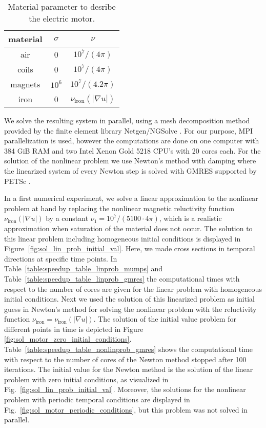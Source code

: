 \documentclass[12pt]{article}
\numberwithin{equation}{section}
\begin{document}
\begin{table}
  \caption{Material parameter to desribe the electric motor.}
  \label{table:material_paramter}
\begin{center}
\begin{tabular}[tbhp]{ |ccc| } 
 \hline
 material & $\sigma$ & $\nu$ \\
 \hline
 air & 0 & $10^7 / (4 \pi) $  \\ 
 coils & 0 & $10^7 / (4 \pi)$ \\
 magnets & $10^6$ & $10^7 / (4.2 \pi)$ \\ 
 iron & 0 & $\nu_{\text{iron}}(|\nabla u|)$ \\  
 \hline
\end{tabular}
\end{center}
\end{table}

We solve the resulting system in parallel, using a mesh decomposition
method provided by the finite element library Netgen/NGSolve \cite{netgen}.
For our purpose, MPI parallelization is used, however the computations are
done on one computer with 384 GiB RAM and two Intel Xenon Gold 5218 CPU’s with 20 cores each.
For the solution of the nonlinear problem we use Newton's method with damping where the linearized system of every Newton step is solved with
GMRES supported by PETSc \cite{DaPaKlCo2011}.

In a first numerical experiment, we solve a linear approximation to the nonlinear problem at hand by replacing the nonlinear magnetic reluctivity function $\nu_{\text{iron}}(|\nabla u|)$ by a constant $\nu_1 = 10^7/(5100 \cdot 4 \pi)$, which is a realistic approximation when saturation of the material does not occur. The solution to this linear problem including homogeneous initial conditions is displayed in Figure~\ref{fig:sol_lin_prob_initial_val}. Here, we made cross sections in
temporal directions at specific time points. In Table~\ref{table:speedup_table_linprob_mumps} and
Table~\ref{table:speedup_table_linprob_gmres} the computational times with
respect to the number of cores are given for the linear problem with
homogeneous initial conditions. Next we used the solution of this linearized problem as initial guess in Newton's method for solving the nonlinear problem with the reluctivity function $\nu_{\text{iron}}=\nu_{\text{iron}}(|\nabla u|)$. The solution of the initial value problem for different points in time is depicted in Figure \ref{fig:sol_motor_zero_initial_conditions}.
Table~\ref{table:speedup_table_nonlinprob_gmres}
shows the computational time with respect to the number of cores of the
Newton method stopped after 100 iterations. The initial value for the
Newton method is the solution of the linear problem with zero initial
conditions, as visualized in Fig.~\ref{fig:sol_lin_prob_initial_val}.
Moreover, the solutions for the nonlinear problem with periodic temporal conditions
are displayed in Fig.~\ref{fig:sol_motor_periodic_conditions}, but this problem
was not solved in parallel.
\end{document}
